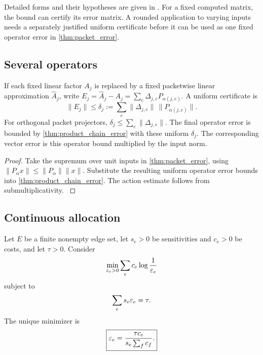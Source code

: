 Detailed forms and their hypotheses are given in \cite{Higham2002,HighamMary2021}. For a fixed computed matrix, the bound can certify its error matrix. A rounded application to varying inputs needs a separately justified uniform certificate before it can be used as one fixed operator error in \cref{thm:packet_error}.

\subsection{Several operators}\label{main:subsection:009}

\begin{corollary}\label{main:corollary:012}\label{cor:mixed_chain}
If each fixed linear factor $A_j$ is replaced by a fixed packetwise linear approximation $\widehat A_j$, write $E_j=\widehat A_j-A_j=\sum_e\Delta_{j,e}P_{\alpha(j,e)}$. A uniform certificate is
\[
\|E_j\|\le\delta_j:=\sum_e\|\Delta_{j,e}\|\,\|P_{\alpha(j,e)}\|.
\]
For orthogonal packet projectors, $\delta_j\le\sum_e\|\Delta_{j,e}\|$. The final operator error is bounded by \cref{thm:product_chain_error} with these uniform $\delta_j$. The corresponding vector error is this operator bound multiplied by the input norm.
\end{corollary}

\begin{proof}\label{main:proof:038}
Take the supremum over unit inputs in \cref{thm:packet_error}, using $\|P_{\alpha}x\|\le\|P_{\alpha}\|\|x\|$. Substitute the resulting uniform operator error bounds into \cref{thm:product_chain_error}. The action estimate follows from submultiplicativity.
\label{main:proof:038:end}\end{proof}

\subsection{Continuous allocation}\label{main:subsection:010}

\begin{theorem}\label{main:theorem:020}\label{thm:continuous_precision}
Let $E$ be a finite nonempty edge set, let $s_e>0$ be sensitivities and $c_e>0$ be costs, and let $\tau>0$. Consider
\[
\min_{\varepsilon_e>0}
\sum_e c_e\log\frac1{\varepsilon_e}
\]
subject to
\[
\sum_es_e\varepsilon_e=\tau.
\]
The unique minimizer is
\[
\boxed{
\varepsilon_e
=
\frac{\tau c_e}{s_e\sum_fc_f}.
}
\]
\end{theorem}

